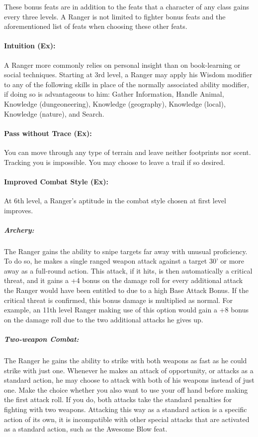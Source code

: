 These bonus feats are in addition to the feats that a character of any class gains every three levels. 
A Ranger is not limited to fighter bonus feats and the aforementioned list of feats when choosing these other feats.
\paragraph{Intuition (Ex):}
A Ranger more commonly relies on personal insight than on book-learning or social techniques.
Starting at 3rd level, a Ranger may apply his Wisdom modifier to any of the following skills in place of the normally associated ability modifier, if doing so is advantageous to him:
Gather Information, Handle Animal, Knowledge (dungeoneering), Knowledge (geography), Knowledge (local), Knowledge (nature), and Search.

\paragraph{Pass without Trace (Ex):}
You can move through any type of terrain and leave neither footprints nor scent. Tracking you is impossible. You may choose to leave a trail if so desired.

\paragraph{Improved Combat Style (Ex):}
At 6th level, a Ranger's aptitude in the combat style chosen at first level improves.

\subparagraph{Archery:} The Ranger gains the ability to snipe targets far away with unusual proficiency.
To do so, he makes a single ranged weapon attack against a target 30' or more away as a full-round action.
This attack, if it hits, is then automatically a critical threat, and it gains a +4 bonus on the damage roll for every additional attack the Ranger would have been entitled to due to a high Base Attack Bonus. If the critical threat is confirmed, this bonus damage is multiplied as normal. 
For example, an 11th level Ranger making use of this option would gain a +8 bonus on the damage roll due to the two additional attacks he gives up.

\subparagraph{Two-weapon Combat:} The Ranger he gains the ability to strike with both weapons as fast as he could strike with just one.
Whenever he makes an attack of opportunity, or attacks as a standard action, he may choose to attack with both of his weapons instead of just one.
Make the choice whether you also want to use your off hand before making the first attack roll. If you do, both attacks take the standard penalties for fighting with two weapons.
Attacking this way as a standard action is a specific action of its own, it is incompatible with other special attacks that are activated as a standard action, such as the Awesome Blow feat.

